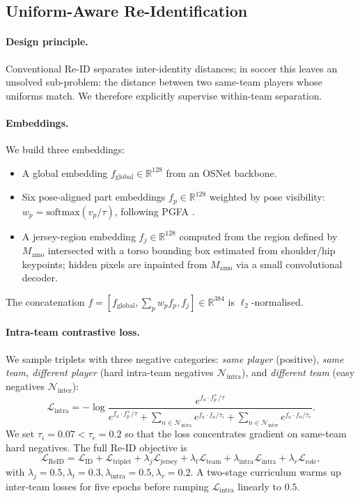\documentclass[conference]{IEEEtran}
\begin{document}
\subsection{Uniform-Aware Re-Identification}
\label{sec:reid}

\paragraph*{Design principle.}
Conventional Re-ID separates inter-identity distances; in soccer this leaves an unsolved sub-problem: the distance between two same-team players whose uniforms match. We therefore explicitly supervise within-team separation.

\paragraph*{Embeddings.}
We build three embeddings:
\begin{itemize}
  \item A global embedding $f_{\text{global}}\in\mathbb{R}^{128}$ from an OSNet backbone.
  \item Six pose-aligned part embeddings $f_p\in\mathbb{R}^{128}$ weighted by pose visibility: $w_p = \mathrm{softmax}(v_p/\tau)$, following PGFA \cite{pgfa}.
  \item A jersey-region embedding $f_j\in\mathbb{R}^{128}$ computed from the region defined by $M_{\text{amo}}$ intersected with a torso bounding box estimated from shoulder/hip keypoints; hidden pixels are inpainted from $M_{\text{amo}}$ via a small convolutional decoder.
\end{itemize}
The concatenation $f=[f_{\text{global}}, \sum_p w_p f_p, f_j]\in\mathbb{R}^{384}$ is $\ell_2$-normalised.

\paragraph*{Intra-team contrastive loss.}
We sample triplets with three negative categories: \emph{same player} (positive), \emph{same team, different player} (hard intra-team negatives $\mathcal{N}_{\text{intra}}$), and \emph{different team} (easy negatives $\mathcal{N}_{\text{inter}}$):
\begin{equation}
\mathcal{L}_{\text{intra}} = -\log\frac{e^{f_a\cdot f_p^+/\tau}}{e^{f_a\cdot f_p^+/\tau} + \sum_{n\in\mathcal{N}_{\text{intra}}}e^{f_a\cdot f_n/\tau_i} + \sum_{n\in\mathcal{N}_{\text{inter}}}e^{f_a\cdot f_n/\tau_e}}.
\label{eq:intra}
\end{equation}
We set $\tau_i=0.07 < \tau_e=0.2$ so that the loss concentrates gradient on same-team hard negatives. The full Re-ID objective is
\begin{equation}
\mathcal{L}_{\text{ReID}} = \mathcal{L}_{\text{ID}} + \mathcal{L}_{\text{triplet}} + \lambda_j\mathcal{L}_{\text{jersey}} + \lambda_t\mathcal{L}_{\text{team}} + \lambda_{\text{intra}}\mathcal{L}_{\text{intra}} + \lambda_r\mathcal{L}_{\text{role}},
\end{equation}
with $\lambda_j=0.5,\lambda_t=0.3,\lambda_{\text{intra}}=0.5,\lambda_r=0.2$. A two-stage curriculum warms up inter-team losses for five epochs before ramping $\mathcal{L}_{\text{intra}}$ linearly to $0.5$.
\end{document}
